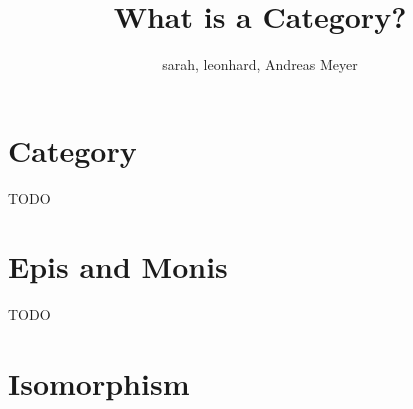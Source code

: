 
\def\pathToRoot{../}



\title{What is a Category?}
\author{sarah, leonhard, Andreas Meyer}
\maketitle

\section {Category}

TODO

\section {Epis and Monis}

TODO

\section {Isomorphism}

